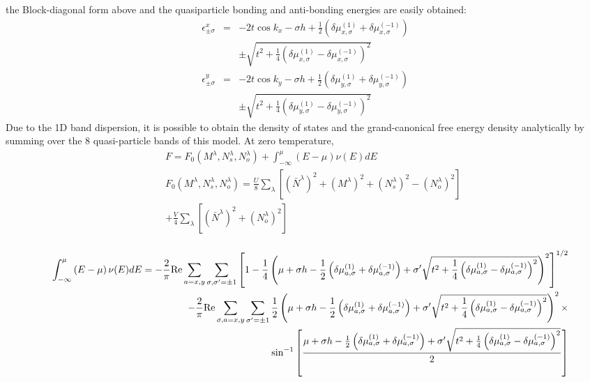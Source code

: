 \documentclass[prb,aps,amssymb,showpacs,twocolumn,amsmath,floatfix]{revtex4}
\begin{document}
the Block-diagonal form above and the quasiparticle bonding and anti-bonding energies are easily obtained:
\begin{eqnarray}
   \epsilon^{x}_{\pm \sigma} &=& -2t \cos k_x - \sigma h+ \frac{1}{2} \left(  \delta \mu^{(1)}_{x ,\sigma} + \delta \mu^{(-1)}_{x, \sigma} \right) \nonumber \\ && \pm \sqrt{t^2+ \frac{1}{4} \left( \delta \mu^{(1)}_{x ,\sigma} - \delta \mu^{(-1)}_{x, \sigma} \right)^2 } \nonumber \\
 \epsilon^{y}_{\pm \sigma} &=& -2t \cos k_y - \sigma h+ \frac{1}{2} \left(  \delta \mu^{(1)}_{y ,\sigma} + \delta \mu^{(-1)}_{y, \sigma} \right)  \nonumber \\ && \pm \sqrt{t^2+ \frac{1}{4} \left( \delta \mu^{(1)}_{y ,\sigma} - \delta \mu^{(-1)}_{y, \sigma} \right)^2 } 
\end{eqnarray}
Due to the 1D band dispersion, it is possible to obtain the density of states and the grand-canonical free energy density 
analytically by  summing over the 8 quasi-particle bands of this model.  At zero temperature,
\begin{eqnarray}
&&F = F_0(M^{\lambda},N^{\lambda}_s,N^{\lambda}_o) + \int_{-\infty}^{\mu} \left( E- \mu \right) \nu(E) d E  \nonumber \\
&&F_0(M^{\lambda},N^{\lambda}_s,N^{\lambda}_o)= \frac{U}{8} \sum_{\lambda} \left[ \left( \bar{N}^{\lambda  } \right)^2 + \left( M^{\lambda } \right)^2 + \left(N_s^{\lambda } \right)^2 -\left( N_o^{\lambda } \right)^2 \right] \nonumber \\
&& + \frac{V}{4} \sum_{\lambda} \left[ \left( \bar{N}^{\lambda } \right)^2 + \left( N_o^{\lambda } \right)^2 \right]  \nonumber \\
\end{eqnarray}
\begin{widetext}
\begin{eqnarray}
&& \int_{-\infty}^{\mu} \left( E- \mu \right) \nu(E) d E  = - \frac{2}{\pi} {\rm Re} \sum_{ a=x,y} \sum_{ \sigma, \sigma' = \pm 1}   \left[ 1 - \frac{1}{4} \left(
 \mu + \sigma h-\frac{1}{2}\left( \delta \mu_{a, \sigma}^{(1)} + \delta \mu_{a, \sigma}^{(-1)} \right) + \sigma' \sqrt{t^2 +\frac{1}{4}  \left(\delta \mu_{a, \sigma}^{(1)} - \delta \mu_{a, \sigma}^{(-1)} \right)^2} \right)^2  \right]^{1/2}  \nonumber \\
&& - \frac{2}{\pi} {\rm Re} \sum_{\sigma, a=x,y} \sum_{ \sigma'= \pm 1}  \frac{1}{2}\left(
 \mu + \sigma h-\frac{1}{2}\left( \delta \mu_{a, \sigma}^{(1)} + \delta \mu_{a, \sigma}^{(-1)} \right) + \sigma' \sqrt{t^2 +\frac{1}{4}  \left(\delta \mu_{a, \sigma}^{(1)} - \delta \mu_{a, \sigma}^{(-1)} \right)^2} \right)^2   \times\nonumber \\
 &&  \sin^{-1} \left[ \frac{\mu + \sigma h-\frac{1}{2}\left( \delta \mu_{a, \sigma}^{(1)} + \delta \mu_{a, \sigma}^{(-1)} \right) + \sigma' \sqrt{t^2 +\frac{1}{4}  \left(\delta \mu_{a, \sigma}^{(1)} - \delta \mu_{a, \sigma}^{(-1)} \right)^{2}}}{2} \right]  \nonumber \\
\end{eqnarray}
\end{widetext}
\end{document}
